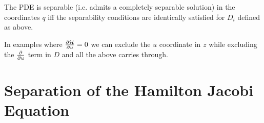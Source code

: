 \documentclass{article}
\begin{document}
\begin{theorem}
The PDE
is separable (i.e. admits a completely separable solution) in the coordinates $q$ iff the separability conditions 
are identically satisfied for $D_i$ defined as above. 
\end{theorem}

\begin{remark}
In examples where $\pd[\mc{H}]{u} = 0$ we can exclude the $u$ coordinate in $z$ while excluding the $\pd{u}$ term in $D$ and all the above carries through.
\end{remark}

\section{Separation of the Hamilton Jacobi Equation}

\end{document}
